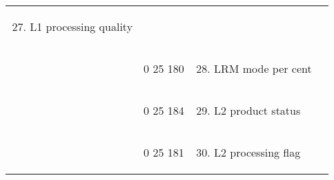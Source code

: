 \begin{longtable}[]{@{}llll@{}}
\begin{minipage}[t]{0.22\columnwidth}
\begin{enumerate}
\setcounter{enumi}{26}
\item
  L1 processing quality
\end{enumerate}\strut
\end{minipage} & \begin{minipage}[t]{0.22\columnwidth}\raggedright
\strut
\end{minipage}\tabularnewline
\begin{minipage}[t]{0.22\columnwidth}\raggedright
\strut
\end{minipage} & \begin{minipage}[t]{0.22\columnwidth}\raggedright
0 25 180\strut
\end{minipage} & \begin{minipage}[t]{0.22\columnwidth}\raggedright
\begin{enumerate}
\setcounter{enumi}{27}
\item
  LRM mode per cent
\end{enumerate}\strut
\end{minipage} & \begin{minipage}[t]{0.22\columnwidth}\raggedright
\strut
\end{minipage}\tabularnewline
\begin{minipage}[t]{0.22\columnwidth}\raggedright
\strut
\end{minipage} & \begin{minipage}[t]{0.22\columnwidth}\raggedright
0 25 184\strut
\end{minipage} & \begin{minipage}[t]{0.22\columnwidth}\raggedright
\begin{enumerate}
\setcounter{enumi}{28}
\item
  L2 product status
\end{enumerate}\strut
\end{minipage} & \begin{minipage}[t]{0.22\columnwidth}\raggedright
\strut
\end{minipage}\tabularnewline
\begin{minipage}[t]{0.22\columnwidth}\raggedright
\strut
\end{minipage} & \begin{minipage}[t]{0.22\columnwidth}\raggedright
0 25 181\strut
\end{minipage} & \begin{minipage}[t]{0.22\columnwidth}\raggedright
\begin{enumerate}
\setcounter{enumi}{29}
\item
  L2 processing flag

\end{enumerate}
\end{minipage}
\end{longtable}
